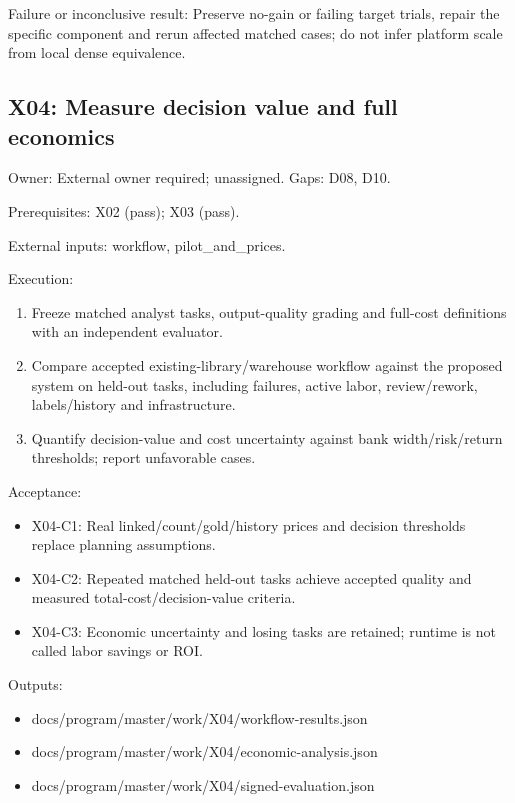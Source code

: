 \documentclass[
  11pt,
  a4paper,
]{article}
\providecommand{\tightlist}{%
  \setlength{\itemsep}{0pt}\setlength{\parskip}{0pt}}
\begin{document}
Failure or inconclusive result: Preserve no-gain or failing target
trials, repair the specific component and rerun affected matched cases;
do not infer platform scale from local dense equivalence.

\hypertarget{x04-measure-decision-value-and-full-economics}{%
\subsection{X04: Measure decision value and full
economics}\label{x04-measure-decision-value-and-full-economics}}

Owner: External owner required; unassigned. Gaps: D08, D10.

Prerequisites: X02 (pass); X03 (pass).

External inputs: workflow, pilot\_and\_prices.

Execution:

\begin{enumerate}
\def\labelenumi{\arabic{enumi}.}
\tightlist
\item
  Freeze matched analyst tasks, output-quality grading and full-cost
  definitions with an independent evaluator.
\item
  Compare accepted existing-library/warehouse workflow against the
  proposed system on held-out tasks, including failures, active labor,
  review/rework, labels/history and infrastructure.
\item
  Quantify decision-value and cost uncertainty against bank
  width/risk/return thresholds; report unfavorable cases.
\end{enumerate}

Acceptance:

\begin{itemize}
\tightlist
\item
  X04-C1: Real linked/count/gold/history prices and decision thresholds
  replace planning assumptions.
\item
  X04-C2: Repeated matched held-out tasks achieve accepted quality and
  measured total-cost/decision-value criteria.
\item
  X04-C3: Economic uncertainty and losing tasks are retained; runtime is
  not called labor savings or ROI.
\end{itemize}

Outputs:

\begin{itemize}
\tightlist
\item
  docs/program/master/work/X04/workflow-results.json
\item
  docs/program/master/work/X04/economic-analysis.json
\item
  docs/program/master/work/X04/signed-evaluation.json
\end{itemize}
\end{document}
